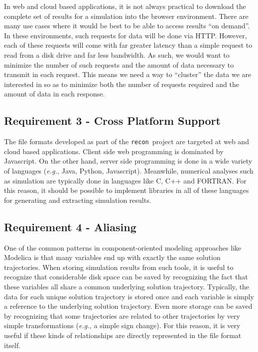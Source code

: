 \documentclass[11pt,a4paper,twocolumn]{article}
\newcommand{\recon}{\texttt{recon}}
\begin{document}

In web and cloud based applications, it is not always practical to
download the complete set of results for a simulation into the browser
environment.  There are many use cases where it would be best to be
able to access results ``on demand''.  In these environments, such
requests for data will be done via HTTP\cite{HTTP}.  However, each of
these requests will come with far greater latency than a simple
request to read from a disk drive and far less bandwidth.  As such, we
would want to minimize the number of such requests and the amount of
data necessary to transmit in each request.  This means we need a way
to ``cluster'' the data we are interested in so as to minimize both
the number of requests required and the amount of data in each
response.

\subsection{Requirement 3 - Cross Platform Support}


The file formats developed as part of the \recon\ project are targeted
at web and cloud based applications.  Client side web programming is
dominated by Javascript.  On the other hand, server side programming
is done in a wide variety of languages (\textit{e.g.,} Java, Python,
Javascript).  Meanwhile, numerical analyses such as simulation are
typically done in languages like C, C++ and FORTRAN.  For this reason,
it should be possible to implement libraries in all of these languages
for generating and extracting simulation results.

\subsection{Requirement 4 - Aliasing}


One of the common patterns in component-oriented modeling approaches
like Modelica is that many variables end up with exactly the same
solution trajectories.  When storing simulation results from such
tools, it is useful to recognize that considerable disk space can be
saved by recognizing the fact that these variables all share a common
underlying solution trajectory.  Typically, the data for each unique
solution trajectory is stored once and each variable is simply a
reference to the underlying solution trajectory.  Even more storage
can be saved by recognizing that some trajectories are related to
other trajectories by very simple transformations (\textit{e.g.,} a
simple sign change).  For this reason, it is very useful if these
kinds of relationships are directly represented in the file format
itself.
\end{document}
